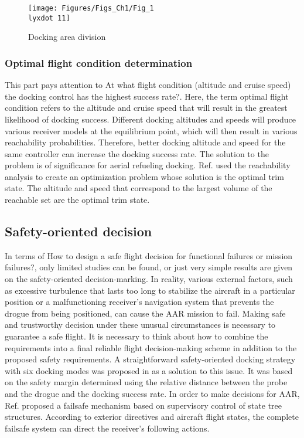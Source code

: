 \begin{figure}
\begin{centering}
\texttt{[image: Figures/Figs\_Ch1/Fig\_1\\lyxdot 11]}
\par\end{centering}
\caption{Docking area division \cite{Dibley-2007-2}}

\centering{}\label{Fig_1.11}
\end{figure}


\subsubsection{Optimal flight condition determination}

This part pays attention to \textquotedbl At what flight condition
(altitude and cruise speed) the docking control has the highest success
rate?\textquotedbl . Here, the term \textquotedbl optimal flight
condition\textquotedbl{} refers to the altitude and cruise speed that
will result in the greatest likelihood of docking success. Different
docking altitudes and speeds will produce various receiver models
at the equilibrium point, which will then result in various reachability
probabilities. Therefore, better docking altitude and speed for the
same controller can increase the docking success rate. The solution
to the problem is of significance for aerial refueling docking. Ref.\cite{liu2021reachability}
used the reachability analysis to create an optimization problem whose
solution is the optimal trim state. The altitude and speed that correspond
to the largest volume of the reachable set are the optimal trim state.

\subsection{Safety-oriented decision}

In terms of \textquotedbl How to design a safe flight decision for
functional failures or mission failures?\textquotedbl , only limited
studies can be found, or just very simple results are given on the
safety-oriented decision-marking. In reality, various external factors,
such as excessive turbulence that lasts too long to stabilize the
aircraft in a particular position or a malfunctioning receiver's navigation
system that prevents the drogue from being positioned, can cause the
AAR mission to fail. Making safe and trustworthy decision under these
unusual circumstances is necessary to guarantee a safe flight. It
is necessary to think about how to combine the requirements into a
final reliable flight decision-making scheme in addition to the proposed
safety requirements. A straightforward safety-oriented docking strategy
with six docking modes was proposed in \cite{liu2020docking} as a solution to this
issue. It was based on the safety margin determined using the relative
distance between the probe and the drogue and the docking success
rate. In order to make decisions for AAR, Ref.\cite{dong2019failsafe}
proposed a failsafe mechanism based on supervisory control of state
tree structures. According to exterior directives and aircraft flight
states, the complete failsafe system can direct the receiver's following
actions.

